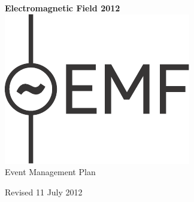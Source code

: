 

\newcommand{\st}{\superscript{st} }
\newcommand{\nd}{\superscript{nd} }



\begin{titlepage}
\begin{center}
{\bf \LARGE Electromagnetic Field 2012}\\[36pt]
\includegraphics{emf-logo.pdf}\\[48pt]
{\Large Event Management Plan}

\vfill
Revised 11 July 2012

\end{center}
\end{titlepage}



